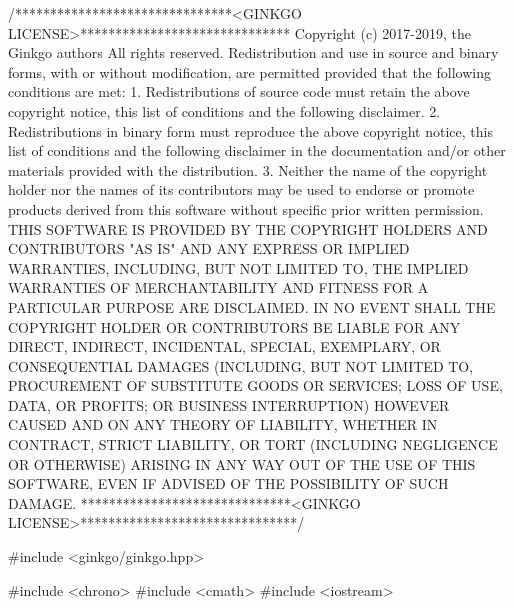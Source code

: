 \begin{DoxyCodeInclude}
\textcolor{comment}{/*******************************<GINKGO LICENSE>******************************}
\textcolor{comment}{Copyright (c) 2017-2019, the Ginkgo authors}
\textcolor{comment}{All rights reserved.}
\textcolor{comment}{}
\textcolor{comment}{Redistribution and use in source and binary forms, with or without}
\textcolor{comment}{modification, are permitted provided that the following conditions}
\textcolor{comment}{are met:}
\textcolor{comment}{}
\textcolor{comment}{1. Redistributions of source code must retain the above copyright}
\textcolor{comment}{notice, this list of conditions and the following disclaimer.}
\textcolor{comment}{}
\textcolor{comment}{2. Redistributions in binary form must reproduce the above copyright}
\textcolor{comment}{notice, this list of conditions and the following disclaimer in the}
\textcolor{comment}{documentation and/or other materials provided with the distribution.}
\textcolor{comment}{}
\textcolor{comment}{3. Neither the name of the copyright holder nor the names of its}
\textcolor{comment}{contributors may be used to endorse or promote products derived from}
\textcolor{comment}{this software without specific prior written permission.}
\textcolor{comment}{}
\textcolor{comment}{THIS SOFTWARE IS PROVIDED BY THE COPYRIGHT HOLDERS AND CONTRIBUTORS "AS}
\textcolor{comment}{IS" AND ANY EXPRESS OR IMPLIED WARRANTIES, INCLUDING, BUT NOT LIMITED}
\textcolor{comment}{TO, THE IMPLIED WARRANTIES OF MERCHANTABILITY AND FITNESS FOR A}
\textcolor{comment}{PARTICULAR PURPOSE ARE DISCLAIMED. IN NO EVENT SHALL THE COPYRIGHT}
\textcolor{comment}{HOLDER OR CONTRIBUTORS BE LIABLE FOR ANY DIRECT, INDIRECT, INCIDENTAL,}
\textcolor{comment}{SPECIAL, EXEMPLARY, OR CONSEQUENTIAL DAMAGES (INCLUDING, BUT NOT}
\textcolor{comment}{LIMITED TO, PROCUREMENT OF SUBSTITUTE GOODS OR SERVICES; LOSS OF USE,}
\textcolor{comment}{DATA, OR PROFITS; OR BUSINESS INTERRUPTION) HOWEVER CAUSED AND ON ANY}
\textcolor{comment}{THEORY OF LIABILITY, WHETHER IN CONTRACT, STRICT LIABILITY, OR TORT}
\textcolor{comment}{(INCLUDING NEGLIGENCE OR OTHERWISE) ARISING IN ANY WAY OUT OF THE USE}
\textcolor{comment}{OF THIS SOFTWARE, EVEN IF ADVISED OF THE POSSIBILITY OF SUCH DAMAGE.}
\textcolor{comment}{******************************<GINKGO LICENSE>*******************************/}

\textcolor{preprocessor}{#include <ginkgo/ginkgo.hpp>}


\textcolor{preprocessor}{#include <chrono>}
\textcolor{preprocessor}{#include <cmath>}
\textcolor{preprocessor}{#include <iostream>}



\end{DoxyCodeInclude}
